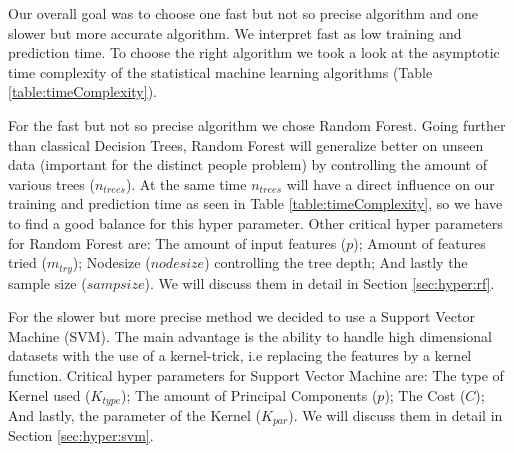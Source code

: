\documentclass[conference]{IEEEtran}
\begin{document}
\textcolor{til}{
    Our overall goal was to choose one fast but not so precise algorithm and one slower but more accurate algorithm. We interpret fast as low training and prediction time. To choose the right algorithm we took a look at the asymptotic time complexity of the statistical machine learning algorithms (Table \ref{table:timeComplexity}).}

\textcolor{til}{
    For the fast but not so precise algorithm we chose Random Forest. Going further than classical Decision Trees, Random Forest will generalize better on unseen data (important for the distinct people problem) by controlling the amount of various trees ($n_{trees}$). At the same time $n_{trees}$ will have a direct influence on our training and prediction time as seen in Table \ref{table:timeComplexity}, so we have to find a good balance for this hyper parameter. Other critical hyper parameters for Random Forest are: The amount of input features ($p$); Amount of features tried ($m_{try}$); Nodesize (${nodesize}$) controlling the tree depth; And lastly the sample size (${sampsize}$). We will discuss them in detail in Section \ref{sec:hyper:rf}.}

\textcolor{maxim}{
    For the slower but more precise method we decided to use a Support Vector Machine (SVM). The main advantage is the ability to handle high dimensional datasets with the use of a kernel-trick, i.e replacing the features by a kernel function. Critical hyper parameters for Support Vector Machine are: The type of Kernel used ($K_{type}$); The amount of Principal Components ($p$); The Cost ($C$); And lastly, the parameter of the Kernel ($K_{par}$).  We will discuss them in detail in Section \ref{sec:hyper:svm}.
}


\end{document}
